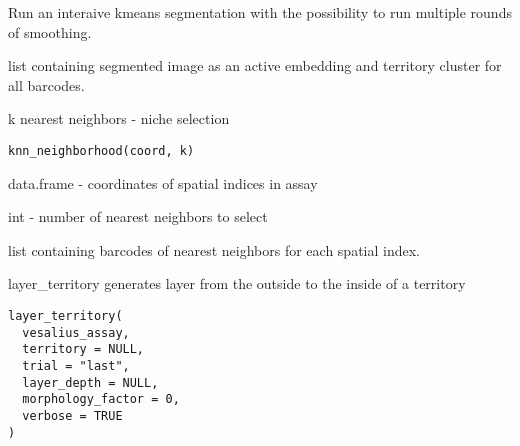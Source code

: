 \documentclass[a4paper]{book}
\begin{document}
%
\begin{Details}
Run an interaive kmeans segmentation with the possibility 
to run multiple rounds of smoothing.
\end{Details}
%
\begin{Value}
list containing segmented image as an active embedding and
territory cluster for all barcodes.
\end{Value}
%
\begin{Description}
k nearest neighbors - niche selection
\end{Description}
%
\begin{Usage}
\begin{verbatim}
knn_neighborhood(coord, k)
\end{verbatim}
\end{Usage}
%
\begin{Arguments}
\begin{ldescription}
\item[\code{coord}] data.frame - coordinates of spatial indices in assay

\item[\code{k}] int - number of nearest neighbors to select
\end{ldescription}
\end{Arguments}
%
\begin{Value}
list containing barcodes of nearest neighbors for each 
spatial index.
\end{Value}
%
\begin{Description}
layer\_territory generates layer from the outside to the inside of 
a territory
\end{Description}
%
\begin{Usage}
\begin{verbatim}
layer_territory(
  vesalius_assay,
  territory = NULL,
  trial = "last",
  layer_depth = NULL,
  morphology_factor = 0,
  verbose = TRUE
)
\end{verbatim}
\end{Usage}
%
\end{document}
